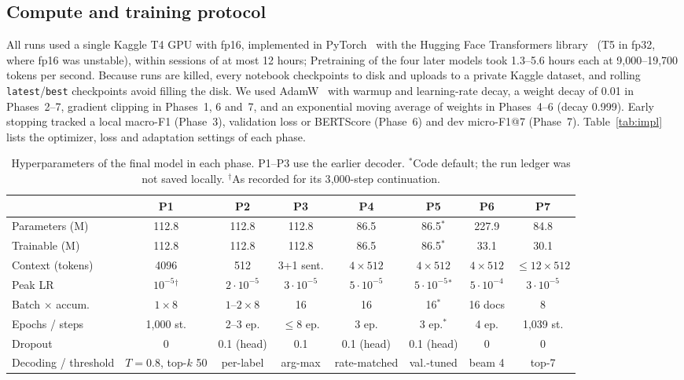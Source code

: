 \documentclass[10pt,a4paper]{article}
\begin{document}
\subsection{Compute and training protocol}
All runs used a single Kaggle T4 GPU with fp16, implemented in PyTorch~\cite{pytorch} with the Hugging Face Transformers library~\cite{wolf} (T5 in fp32, where fp16 was unstable), within sessions of at most 12 hours; Pretraining of the four later models took 1.3--5.6 hours each at 9{,}000--19{,}700 tokens per second. Because runs are killed, every notebook checkpoints to disk and uploads to a private Kaggle dataset, and rolling \texttt{latest}/\texttt{best} checkpoints avoid filling the disk. We used AdamW~\cite{adamw} with warmup and learning-rate decay, a weight decay of 0.01 in Phases~2--7, gradient clipping in Phases~1, 6 and~7, and an exponential moving average of weights in Phases~4--6 (decay 0.999). Early stopping tracked a local macro-F1 (Phase~3), validation loss or BERTScore (Phase~6) and dev micro-F1@7 (Phase~7). Table~\ref{tab:impl} lists the optimizer, loss and adaptation settings of each phase.
\begin{table}[h]\centering\footnotesize
\caption{Hyperparameters of the final model in each phase. P1--P3 use the earlier decoder. $^*$Code default; the run ledger was not saved locally. $^\dagger$As recorded for its 3{,}000-step continuation.}\label{tab:hyper}
\begin{tabular}{@{}lccccccc@{}}
\toprule
 & P1 & P2 & P3 & P4 & P5 & P6 & P7\\\midrule
Parameters (M) & 112.8 & 112.8 & 112.8 & 86.5 & 86.5$^*$ & 227.9 & 84.8\\
Trainable (M) & 112.8 & 112.8 & 112.8 & 86.5 & 86.5$^*$ & 33.1 & 30.1\\
Context (tokens) & 4096 & 512 & 3+1 sent. & $4\times512$ & $4\times512$ & $4\times512$ & $\le12\times512$\\
Peak LR & $10^{-5}$$^\dagger$ & $2\cdot10^{-5}$ & $3\cdot10^{-5}$ & $5\cdot10^{-5}$ & $5\cdot10^{-5}$$^*$ & $5\cdot10^{-4}$ & $3\cdot10^{-5}$\\
Batch $\times$ accum. & $1\times8$ & $1$--$2\times8$ & 16 & 16 & 16$^*$ & 16 docs & 8\\
Epochs / steps & 1{,}000 st. & 2--3 ep. & $\le8$ ep. & 3 ep. & 3 ep.$^*$ & 4 ep. & 1{,}039 st.\\
Dropout & 0 & 0.1 (head) & 0.1 & 0.1 (head) & 0.1 (head) & 0 & 0\\
Decoding / threshold & $T{=}0.8$, top-$k$ 50 & per-label & arg-max & rate-matched & val.-tuned & beam 4 & top-7\\\bottomrule
\end{tabular}
\end{table}
\end{document}
